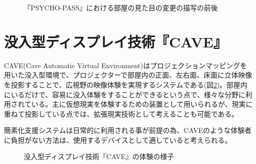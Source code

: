 \begin{figure}[htbp]
  \begin{minipage}{0.5\hsize}
    \begin{center}
    \end{center}
  \end{minipage}
  \begin{minipage}{0.5\hsize}
    \begin{center}
    \end{center}
  \end{minipage}
  \caption{『PSYCHO-PASS』における部屋の見た目の変更の描写の前後}
  \label{fig:psycho}
\end{figure}

\section{没入型ディスプレイ技術『CAVE』}

CAVE(Cave Automatic Virtual Environment)\cite{cave1}はプロジェクションマッピングを用いた没入型環境で、プロジェクターで部屋内の正面、左右面、床面に立体映像を投影することで、広視野の映像体験を実現するシステムである(図\ref{fig:cave})\cite{cave2}。部屋内にいるだけで、容易に没入体験をすることができるという点で、様々な分野に利用されている。主に仮想現実を体験するための装置として用いられるが、現実に重ねて投影している点では、拡張現実技術として考えることも可能である。

簡素化支援システムは日常的に利用される事が前提の為、CAVEのような体験者に負担がない方法は、使用するデバイスとして適していると考えられる。

\begin{figure}[htbp]
  \begin{center}
  \end{center}
  \caption{没入型ディスプレイ技術『CAVE』の体験の様子}
  \label{fig:cave}
\end{figure}

